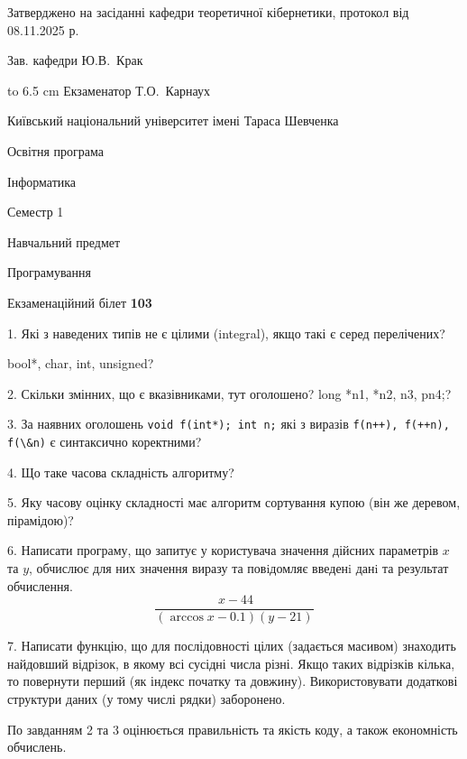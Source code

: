 \documentclass[12pt, ukrainian]{article}
\def\code#1{\Verb!#1!}
\begin{document}
{\smallskip\smallskip \begin {scriptsize} Затверджено на засіданні кафедри теоретичної кібернетики, протокол   від   08.11.2025 р.\par\smallskip\smallskip\smallskip\smallskip
{\parbox {6.5 cm} {Зав. кафедри \dotfill Ю.В.~Крак}}\hspace {0.7cm} {\hbox to 6.5 cm { Екзаменатор \dotfill Т.О.~Карнаух}} \end{scriptsize}}
\newpage
{{\begin {scriptsize}\par
{ \center  Київський національний університет імені Тараса Шевченка \par}
{\parbox {5 cm}{Освітня програма \hfill}{\parbox {7 cm}{Інформатика\hfill}}\parbox {6 cm}{\hfill Семестр 1}}\par
{\parbox {5 cm} {Навчальний предмет \hfill}\parbox {7 cm}{Програмування \hfill}\parbox {6cm}{\hfill}\par}\vspace{-15pt} \end{scriptsize}}{\center Екзаменаційний білет \No \textbf { 103 }\par}}
{%
1. Які з наведених типів не є цілими (integral), якщо такі є серед перелічених?

bool*, char, int, unsigned?
\par
\vspace{2mm}
2. Скільки змінних, що є вказівниками, тут оголошено?
long *n1, *n2, n3, pn4;?
\par
\vspace{2mm}
3. За наявних оголошень \code{void f(int*); int n;} які з виразів \code{f(n++), f(++n), f(\&n)} є синтаксично коректними?
\par
\vspace{2mm}
4. Що таке часова складність алгоритму?
\par
\vspace{2mm}
5. Яку часову оцінку складності має алгоритм сортування купою (він же деревом, пірамідою)?
\par
\vspace{2mm}
6. Написати програму, що запитує у користувача значення дійсних параметрів $x$ та $y$, обчислює для них значення виразу та повiдомляє введенi данi та результат обчислення.
$$\frac{\ x - 44}{(\arccos x - 0.1) (y - 21)}$$ 

\par
7. Написати функцію, що для послідовності цілих (задається масивом) знаходить найдовший відрізок, в якому всі сусідні числа різні. Якщо таких відрізків кілька, то повернути перший (як індекс початку та довжину). Використовувати додаткові структури даних (у тому числі рядки) заборонено.

По завданням 2 та 3 оцінюється правильність та якість коду, а також економність обчислень.

}
\end{document}
